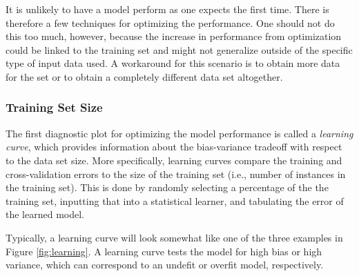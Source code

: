 It is unlikely to have a model perform as one expects the first time. There is
therefore a few techniques for optimizing the performance. One should not do
this too much, however, because the increase in performance from optimization
could be linked to the training set and might not generalize outside of the
specific type of input data used.  A workaround for this scenario is to obtain
more data for the set or to obtain a completely different data set altogether. 

\subsubsection{Training Set Size}

The first diagnostic plot for optimizing the model performance is called a
\textit{learning curve}, which provides information about the bias-variance
tradeoff with respect to the data set size. More specifically, learning curves
compare the training and cross-validation errors to the size of the training
set (i.e., number of instances in the training set). This is done by randomly
selecting a percentage of the the training set, inputting that into a
statistical learner, and tabulating the error of the learned model. 

Typically, a learning curve will look somewhat like one of the three examples
in Figure \ref{fig:learning}.  A learning curve tests the model for high bias
or high variance, which can correspond to an undefit or overfit model,
respectively. 

